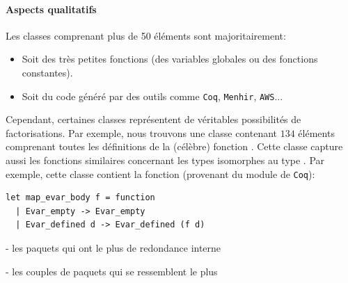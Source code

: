 \paragraph{Aspects qualitatifs}

Les classes comprenant plus de 50 éléments sont majoritairement:
\begin{itemize}
\item Soit des très petites fonctions (des variables globales ou des fonctions constantes).
\item Soit du code généré par des outils comme \verb|Coq|, \verb|Menhir|, \verb|AWS|...
\end{itemize}

Cependant, certaines classes représentent de véritables possibilités de factorisations. Par exemple, nous trouvons une classe contenant $134$ éléments comprenant toutes les définitions de la (célèbre) fonction . Cette classe capture aussi les fonctions similaires concernant les types isomorphes au type . Par exemple, cette classe contient la fonction (provenant du module  de \verb|Coq|):

\begin{verbatim}
let map_evar_body f = function
  | Evar_empty -> Evar_empty
  | Evar_defined d -> Evar_defined (f d)
\end{verbatim}

- les paquets qui ont le plus de redondance interne

- les couples de paquets qui se ressemblent le plus
